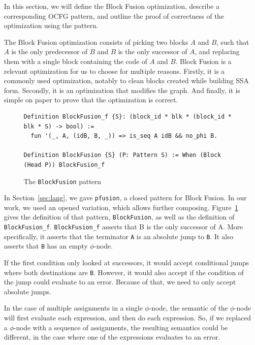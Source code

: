 \documentclass[11pt]{article}
\newcommand{\inlinecoq}[1]{\mbox{\lstinline[style=customcoq,columns=fixed,basewidth=.48em]{#1}}}
\newcommand{\ilc}[1]{\inlinecoq{#1}}
\newcommand{\ocfg}{OCFG\xspace}
\begin{document}
In this section, we will define the Block Fusion optimization, describe a corresponding \ocfg pattern, and outline the proof of correctness of the optimization using the pattern.

The Block Fusion optimization consists of picking two blocks $A$ and $B$,
such that $A$ is the only predecessor of $B$ and $B$ is the only successor of $A$,
and replacing them with a single block containing the code of $A$ and $B$.
%
Block Fusion is a relevant optimization for us to choose for multiple reasons. Firstly, it is a commonly used optimization, notably to clean blocks created while building SSA form. Secondly, it is an optimization that modifies the graph. And finally, it is simple on paper to prove that the optimization is correct.

\begin{figure}[h]
  \begin{lstlisting}[style=customcoq,basicstyle=\small\ttfamily]
Definition BlockFusion_f {S}: (block_id * blk * (block_id * blk * S) -> bool) :=
  fun '(_, A, (idB, B, _)) => is_seq A idB && no_phi B.

Definition BlockFusion {S} (P: Pattern S) := When (Block (Head P)) BlockFusion_f
  \end{lstlisting}
  \caption{The \ilc{BlockFusion} pattern}
  \label{fig:bfusion}
\end{figure}

In Section~\ref{sec:lang}, we gave \ilc{pfusion}, a closed pattern for Block Fusion. In our work, we used an opened variation, which allows further composing. Figure~\ref{fig:bfusion} gives the definition of that pattern, \ilc{BlockFusion}, as well as the definition of \ilc{BlockFusion_f}.
%
\ilc{BlockFusion_f} asserts that B is the only successor of A. More specifically, it asserts that the terminator \ilc{A} is an absolute jump to \ilc{B}. It also asserts that \ilc{B} has an empty $\phi$-node.

If the first condition only looked at successors, it would accept conditional jumps where both destinations are \ilc{B}. However, it would also accept if the condition of the jump could evaluate to an error. Because of that, we need to only accept absolute jumps.

In the case of multiple assignments in a single $\phi$-node, the semantic of the $\phi$-node will first evaluate each expression, and then do each expression. So, if we replaced a $\phi$-node with a sequence of assignments, the resulting semantics could be different, in the case where one of the expressions evaluates to an error.
\end{document}
